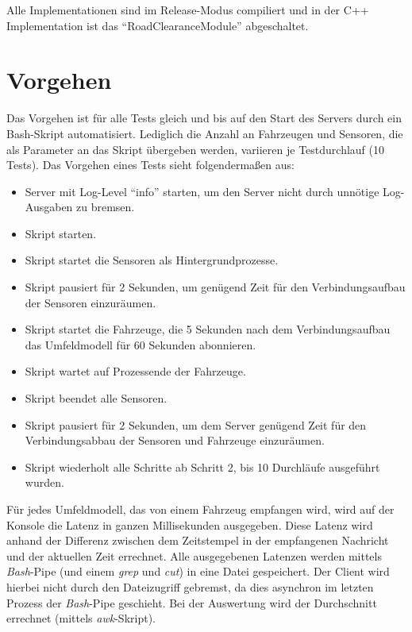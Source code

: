 Alle Implementationen sind im Release-Modus compiliert und in der C++ Implementation ist das \enquote{RoadClearanceModule} abgeschaltet.

\section{Vorgehen}
\label{eval:howto}

Das Vorgehen ist für alle Tests gleich und bis auf den Start des Servers durch ein Bash-Skript automatisiert.
Lediglich die Anzahl an Fahrzeugen und Sensoren, die als Parameter an das Skript übergeben werden, variieren je Testdurchlauf (10 Tests).
Das Vorgehen eines Tests sieht folgendermaßen aus:

\begin{itemize}
	\item Server mit Log-Level \enquote{info} starten, um den Server nicht durch unnötige Log-Ausgaben zu bremsen.
	\item Skript starten.
	\item Skript startet die Sensoren als Hintergrundprozesse.
	\item Skript pausiert für 2 Sekunden, um genügend Zeit für den Verbindungsaufbau der Sensoren einzuräumen.
	\item Skript startet die Fahrzeuge, die 5 Sekunden nach dem Verbindungsaufbau das Umfeldmodell für 60 Sekunden abonnieren.
	\item Skript wartet auf Prozessende der Fahrzeuge.
	\item Skript beendet alle Sensoren.
	\item Skript pausiert für 2 Sekunden, um dem Server genügend Zeit für den Verbindungsabbau der Sensoren und Fahrzeuge einzuräumen.
	\item Skript wiederholt alle Schritte ab Schritt 2, bis 10 Durchläufe ausgeführt wurden.
\end{itemize}

Für jedes Umfeldmodell, das von einem Fahrzeug empfangen wird, wird auf der Konsole die Latenz in ganzen Millisekunden ausgegeben.
Diese Latenz wird anhand der Differenz zwischen dem Zeitstempel in der empfangenen Nachricht und der aktuellen Zeit errechnet.
Alle ausgegebenen Latenzen werden mittels \textit{Bash}-Pipe (und einem \textit{grep} und \textit{cut}) in eine Datei gespeichert.
Der Client wird hierbei nicht durch den Dateizugriff gebremst, da dies asynchron im letzten Prozess der \textit{Bash}-Pipe geschieht.
Bei der Auswertung wird der Durchschnitt errechnet (mittels \textit{awk}-Skript).

